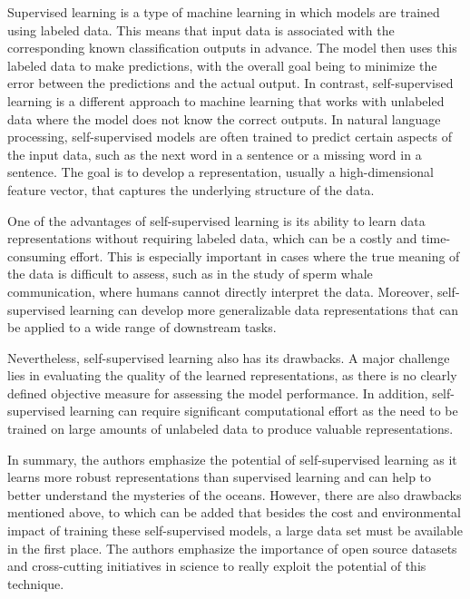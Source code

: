 \documentclass[10pt]{article}
\newenvironment{AnswerBox}{\begin{mdframed}[style=simple]}{\end{mdframed}}
\begin{document}
\begin{AnswerBox}%


  Supervised learning is a type of machine learning in which models are trained using labeled data. This means that input data is associated with the corresponding known classification outputs in advance. The model then uses this labeled data to make predictions, with the overall goal being to minimize the error between the predictions and the actual output. In contrast, self-supervised learning is a different approach to machine learning that works with unlabeled data where the model does not know the correct outputs. In natural language processing, self-supervised models are often trained to predict certain aspects of the input data, such as the next word in a sentence or a missing word in a sentence. The goal is to develop a representation, usually a high-dimensional feature vector, that captures the underlying structure of the data.

  One of the advantages of self-supervised learning is its ability to learn data representations without requiring labeled data, which can be a costly and time-consuming effort. This is especially important in cases where the true meaning of the data is difficult to assess, such as in the study of sperm whale communication, where humans cannot directly interpret the data. Moreover, self-supervised learning can develop more generalizable data representations that can be applied to a wide range of downstream tasks.

  Nevertheless, self-supervised learning also has its drawbacks. A major challenge lies in evaluating the quality of the learned representations, as there is no clearly defined objective measure for assessing the model performance. In addition, self-supervised learning can require significant computational effort as the need to be trained on large amounts of unlabeled data to produce valuable representations.

  In summary, the authors emphasize the potential of self-supervised learning as it learns more robust representations than supervised learning and can help to better understand the mysteries of the oceans. However, there are also drawbacks mentioned above, to which can be added that besides the cost and environmental impact of training these self-supervised models, a large data set must be available in the first place. The authors emphasize the importance of open source datasets and cross-cutting initiatives in science to really exploit the potential of this technique.

\end{AnswerBox}%
\end{document}
